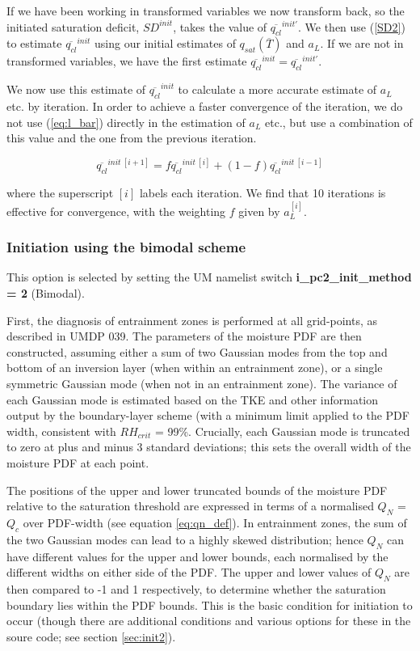 \documentclass{UMDP_article}
\begin{document}
If we have been working in transformed variables we now transform
back, so the initiated saturation deficit, $SD^{init}$, takes the
value of $\overline{q_{cl}}^{init'}$. We then use (\ref{SD2}) to
estimate $\overline{q_{cl}}^{init}$ using our initial estimates of
$q_{sat}(\overline{T})$ and $a_L$. If we are not in transformed
variables, we have the first estimate
$\overline{q_{cl}}^{init}=\overline{q_{cl}}^{init'}$.

We now use this estimate of $\overline{q_{cl}}^{init}$ to
calculate a more accurate estimate of $a_L$ etc. by iteration. In order to
achieve a faster convergence of the iteration, we do not use
(\ref{eq:l_bar}) directly in the estimation of $a_L$ etc., but
use a combination of this value and the one from the previous iteration.

\begin{equation}
\overline{q_{cl}}^{init~[i+1]} = f  \overline{q_{cl}}^{init~[i]} +
(1 - f) \overline{q_{cl}}^{init~[i-1]}
\label{eq:iter}
\end{equation}

where the superscript $[i]$ labels each iteration. We find that 10
iterations is effective for convergence, with the weighting
$f$ given by $a_L^{[i]}$.

\subsubsection{Initiation using the bimodal scheme}
\label{sec:bimodal_init}

This option is selected by setting the UM namelist switch
{\bf i\_pc2\_init\_method = 2} (Bimodal).

First, the diagnosis of entrainment zones is performed at all grid-points,
as described in UMDP 039.  The parameters of the moisture PDF are then
constructed, assuming either a sum of two Gaussian modes from the top
and bottom of an inversion layer (when within an entrainment zone),
or a single symmetric Gaussian mode (when not in an entrainment zone).
The variance of each Gaussian mode is estimated based on the TKE and other
information output by the boundary-layer scheme
(with a minimum limit applied to the PDF width, consistent with
$RH_{crit}$ = 99\%.
Crucially, each Gaussian mode is truncated to zero at plus and minus
3 standard deviations; this sets the overall width of the moisture
PDF at each point.

The positions of the upper and lower truncated bounds of the moisture PDF
relative to the saturation threshold are expressed in terms of a normalised
$Q_N$ = $Q_c$ over PDF-width (see equation \ref{eq:qn_def}).
In entrainment zones, the sum of the two Gaussian modes can lead to
a highly skewed distribution; hence $Q_N$ can have different values for the
upper and lower bounds, each normalised by the different widths on
either side of the PDF.  The upper and lower values of $Q_N$ are then
compared to -1 and 1 respectively, to determine whether the saturation
boundary lies within the PDF bounds.  This is the basic condition for
initiation to occur (though there are additional conditions and various
options for these in the soure code; see section \ref{sec:init2}).
\end{document}
